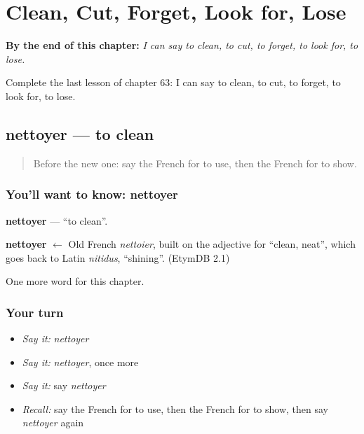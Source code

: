 
\chapter{Clean, Cut, Forget, Look for, Lose}
\label{ch:fr-clean-cut-forget-look-for-lose}

\begin{chapteropening}
\textbf{By the end of this chapter:} \emph{I can say to clean, to cut, to forget, to look for, to lose.}

Complete the last lesson of chapter 63: I can say to clean, to cut, to forget, to look for, to lose.
\end{chapteropening}

\section[nettoyer]{nettoyer — to clean}

\label{lesson:FR-C63-nettoyer}



\begin{quote}
Before the new one: say the French for to use, then the French for to show.
\end{quote}

\subsection*{You'll want to know: nettoyer}
\textbf{nettoyer} — \textquotedblleft{}to clean\textquotedblright{}.

\begin{cousinweb}
\textbf{nettoyer} $\leftarrow$ Old French \emph{nettoier}, built on the adjective for \textquotedblleft{}clean, neat\textquotedblright{}, which goes back to Latin \emph{nitidus}, \textquotedblleft{}shining\textquotedblright{}. (EtymDB 2.1)
\end{cousinweb}

\begin{grammarlens}[title={What you've built}]
One more word for this chapter.
\end{grammarlens}

\subsection*{Your turn}
\begin{itemize}
\raggedright
  \item \emph{Say it:} \emph{nettoyer}
  \item \emph{Say it:} \emph{nettoyer}, once more
  \item \emph{Say it:} say \emph{nettoyer}
  \item \emph{Recall:} say the French for to use, then the French for to show, then say \emph{nettoyer} again
\end{itemize}

